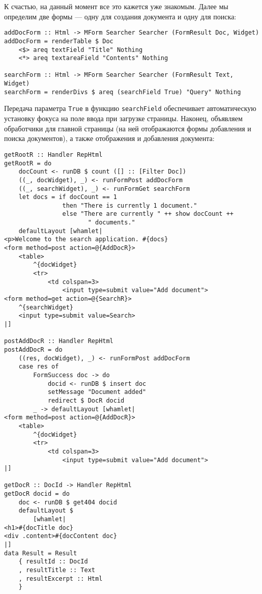 К счастью, на данный момент все это кажется уже знакомым. Далее мы определим две формы --- одну для создания документа и одну для поиска:

\begin{lstlisting}
addDocForm :: Html -> MForm Searcher Searcher (FormResult Doc, Widget)
addDocForm = renderTable $ Doc
    <$> areq textField "Title" Nothing
    <*> areq textareaField "Contents" Nothing

searchForm :: Html -> MForm Searcher Searcher (FormResult Text, Widget)
searchForm = renderDivs $ areq (searchField True) "Query" Nothing
\end{lstlisting}%

Передача параметра \lstinline'True' в функцию \lstinline'searchField' обеспечивает автоматическую установку фокуса на поле ввода при загрузке страницы. Наконец, объявляем обработчики для главной страницы (на ней отображаются формы добавления и поиска документов), а также отображения и добавления документа:

\begin{lstlisting}
getRootR :: Handler RepHtml
getRootR = do
    docCount <- runDB $ count ([] :: [Filter Doc])
    ((_, docWidget), _) <- runFormPost addDocForm
    ((_, searchWidget), _) <- runFormGet searchForm
    let docs = if docCount == 1
                then "There is currently 1 document."
                else "There are currently " ++ show docCount ++
                       " documents."
    defaultLayout [whamlet|
<p>Welcome to the search application. #{docs}
<form method=post action=@{AddDocR}>
    <table>
        ^{docWidget}
        <tr>
            <td colspan=3>
                <input type=submit value="Add document">
<form method=get action=@{SearchR}>
    ^{searchWidget}
    <input type=submit value=Search>
|]

postAddDocR :: Handler RepHtml
postAddDocR = do
    ((res, docWidget), _) <- runFormPost addDocForm
    case res of
        FormSuccess doc -> do
            docid <- runDB $ insert doc
            setMessage "Document added"
            redirect $ DocR docid
        _ -> defaultLayout [whamlet|
<form method=post action=@{AddDocR}>
    <table>
        ^{docWidget}
        <tr>
            <td colspan=3>
                <input type=submit value="Add document">
|]

getDocR :: DocId -> Handler RepHtml
getDocR docid = do
    doc <- runDB $ get404 docid
    defaultLayout $
        [whamlet|
<h1>#{docTitle doc}
<div .content>#{docContent doc}
|]
data Result = Result
    { resultId :: DocId
    , resultTitle :: Text
    , resultExcerpt :: Html
    }
\end{lstlisting}%

